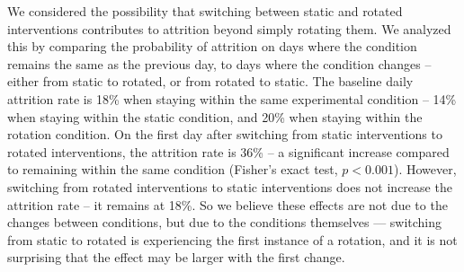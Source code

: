 We considered the possibility that switching between static and rotated interventions contributes to attrition beyond simply rotating them. We analyzed this by comparing the probability of attrition on days where the condition remains the same as the previous day, to days where the condition changes -- either from static to rotated, or from rotated to static. The baseline daily attrition rate is 18\% when staying within the same experimental condition -- 14\% when staying within the static condition, and 20\% when staying within the rotation condition. On the first day after switching from static interventions to rotated interventions, the attrition rate is 36\% -- a significant increase compared to remaining within the same condition (Fisher's exact test, $p < 0.001$). However, switching from rotated interventions to static interventions does not increase the attrition rate -- it remains at 18\%. So we believe these effects are not due to the changes between conditions, but due to the conditions themselves --- switching from static to rotated is experiencing the first instance of a rotation, and it is not surprising that the effect may be larger with the first change.








